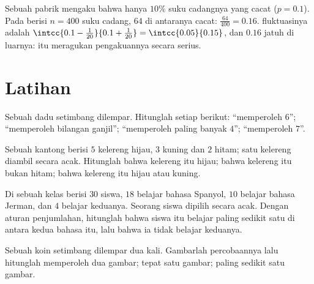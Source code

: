 \begin{example}\label{ex:g10:proba:test}
Sebuah pabrik mengaku bahwa hanya $10\%$ suku cadangnya yang cacat
($p = 0.1$). Pada  berisi $n = 400$ suku cadang, $64$ di antaranya cacat:
 $\frac{64}{400} = 0.16$.  fluktuasinya adalah
$\intcc{0.1 - \frac{1}{20}}{0.1 + \frac{1}{20}} = \intcc{0.05}{0.15}$,
dan $0.16$ jatuh di luarnya:  itu meragukan pengakuannya secara serius.
\end{example}

\section{Latihan}

\begin{exercise}[$\star$]\label{exo:g10:proba:1}
Sebuah dadu setimbang dilempar. Hitunglah  setiap  berikut:
``memperoleh $6$''; ``memperoleh bilangan ganjil''; ``memperoleh paling banyak
$4$''; ``memperoleh $7$''.
\end{exercise}

\begin{exercise}[$\star$]\label{exo:g10:proba:2}
Sebuah kantong berisi $5$ kelereng hijau, $3$ kuning dan $2$ hitam; satu
kelereng diambil secara acak. Hitunglah  bahwa kelereng itu hijau; bahwa
kelereng itu bukan hitam; bahwa kelereng itu hijau atau kuning.
\end{exercise}

\begin{exercise}[$\star$]\label{exo:g10:proba:3}
Di sebuah kelas berisi $30$ siswa, $18$ belajar bahasa Spanyol, $10$ belajar
bahasa Jerman, dan $4$ belajar keduanya. Seorang siswa dipilih secara acak.
Dengan aturan penjumlahan, hitunglah  bahwa siswa itu belajar paling
sedikit satu di antara kedua bahasa itu, lalu  bahwa ia tidak belajar keduanya.
\end{exercise}

\begin{exercise}[$\star$]\label{exo:g10:proba:4}
Sebuah koin setimbang dilempar dua kali. Gambarlah  percobaannya lalu
hitunglah  memperoleh dua gambar; tepat satu gambar; paling sedikit satu
gambar.
\end{exercise}

